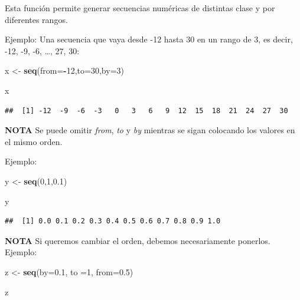 \documentclass[
]{book}
\newenvironment{Shaded}{\begin{snugshade}}{\end{snugshade}}
\newcommand{\AttributeTok}[1]{\textcolor[rgb]{0.13,0.29,0.53}{#1}}
\newcommand{\DecValTok}[1]{\textcolor[rgb]{0.00,0.00,0.81}{#1}}
\newcommand{\FloatTok}[1]{\textcolor[rgb]{0.00,0.00,0.81}{#1}}
\newcommand{\FunctionTok}[1]{\textcolor[rgb]{0.13,0.29,0.53}{\textbf{#1}}}
\newcommand{\NormalTok}[1]{#1}
\newcommand{\OtherTok}[1]{\textcolor[rgb]{0.56,0.35,0.01}{#1}}
\newcommand{\SpecialCharTok}[1]{\textcolor[rgb]{0.81,0.36,0.00}{\textbf{#1}}}
\begin{document}
Esta función permite generar secuencias numéricas de distintas clase y por diferentes rangos.

Ejemplo:
Una secuencia que vaya desde -12 hasta 30 en un rango de 3, es decir, -12, -9, -6, \ldots, 27, 30:

\begin{Shaded}
\begin{Highlighting}[]
\NormalTok{x }\OtherTok{\textless{}{-}} \FunctionTok{seq}\NormalTok{(}\AttributeTok{from=}\SpecialCharTok{{-}}\DecValTok{12}\NormalTok{,}\AttributeTok{to=}\DecValTok{30}\NormalTok{,}\AttributeTok{by=}\DecValTok{3}\NormalTok{)}

\NormalTok{x}
\end{Highlighting}
\end{Shaded}

\begin{verbatim}
##  [1] -12  -9  -6  -3   0   3   6   9  12  15  18  21  24  27  30
\end{verbatim}

\textbf{NOTA} Se puede omitir \emph{from}, \emph{to} y \emph{by} mientras se sigan colocando los valores en el mismo orden.

Ejemplo:

\begin{Shaded}
\begin{Highlighting}[]
\NormalTok{y }\OtherTok{\textless{}{-}} \FunctionTok{seq}\NormalTok{(}\DecValTok{0}\NormalTok{,}\DecValTok{1}\NormalTok{,}\FloatTok{0.1}\NormalTok{)}

\NormalTok{y}
\end{Highlighting}
\end{Shaded}

\begin{verbatim}
##  [1] 0.0 0.1 0.2 0.3 0.4 0.5 0.6 0.7 0.8 0.9 1.0
\end{verbatim}

\textbf{NOTA} Si queremos cambiar el orden, debemos necesariamente ponerlos.
Ejemplo:

\begin{Shaded}
\begin{Highlighting}[]
\NormalTok{z }\OtherTok{\textless{}{-}} \FunctionTok{seq}\NormalTok{(}\AttributeTok{by=}\FloatTok{0.1}\NormalTok{, }\AttributeTok{to =}\DecValTok{1}\NormalTok{, }\AttributeTok{from=}\FloatTok{0.5}\NormalTok{)}

\NormalTok{z}
\end{Highlighting}
\end{Shaded}
\end{document}
